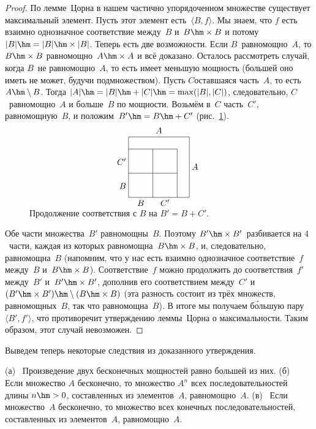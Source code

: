 \begin{proof}
По лемме~Цорна в нашем частично упорядоченном множестве
существует максимальный элемент. Пусть этот элемент
есть~$\langle B,f\rangle$. Мы знаем, что $f$ есть взаимно однозначное
соответствие между~$B$ и~$B\hm\times B$ и потому~$|B|\hm=|B|\hm\times|B|$.
Теперь есть две возможности. Если $B$~равномощно~$A$,
то $B\hm\times B$ равномощно~$A\hm\times A$ и всё
доказано. Осталось рассмотреть случай, когда $B$~не равномощно~$A$,
то есть имеет меньшую мощность (большей оно иметь не может,
будучи подмножеством). Пусть
$C$\т оставшаяся часть~$A$, то
есть~$A\hm\setminus B$. Тогда $|A|\hm=|B|\hm+|C|\hm=\max(|B|,|C|)$,
следовательно, $C$~равномощно~$A$ и больше~$B$ по мощности.
Возьмём в~$C$ часть~$C'$, равномощную~$B$, и положим~$B'\hm=B\hm+C'$
(рис.~\ref{card-2}).
\begin{figure}[ht]
        $$
\unitlength=0.5mm
\begin{picture}(50,55)
\put(0,0){\line(1,0){50}}
\put(0,50){\line(1,0){50}}
\put(0,0){\line(0,1){50}}
\put(50,0){\line(0,1){50}}
\put(20,0){\line(0,1){40}}
\put(40,0){\line(0,1){40}}
\put(0,20){\line(1,0){40}}
\put(0,40){\line(1,0){40}}
\put(10,-7){\hbox to 0pt{\hss $B$\hss}}
\put(30,-7){\hbox to 0pt{\hss $C'$\hss}}
\put(25,53){\hbox to 0pt{\hss $A$\hss}}
\put(-2,7){\hbox to 0pt{\hss $B$}}
\put(-2,27){\hbox to 0pt{\hss $C'$}}
\put(52,23){\hbox to 0pt{$A$\hss}}
\end{picture}
        $$
\caption{Продолжение соответствия с $B$ на $B'=B+C'$.}
\label{card-2}
\end{figure}
Обе части множества~$B'$ равномощны~$B$. Поэтому $B'\hm\times B'$~разбивается
на $4$~части, каждая из которых равномощна~$B\hm\times B$, и, следовательно,
равномощна~$B$ (напомним, что у нас есть
взаимно однозначное соответствие~$f$ между~$B$ и~$B\hm\times B$).
Соответствие~$f$ можно продолжить до соответствия~$f'$ между~$B'$
и~$B'\hm\times B'$, дополнив его соответствием между~$C'$
и $(B'\hm\times B')\hm\setminus(B\hm\times B)$ (эта разность состоит из трёх
множеств, равномощных~$B$, так что равномощна~$B$).
В итоге мы получаем б\'ольшую пару~$\langle B',f'\rangle$,
что противоречит утверждению леммы~Цорна о максимальности.
Таким образом, этот случай невозможен.
\end{proof}

Выведем теперь некоторые следствия из доказанного утверждения.

\begin{theorem}
        \label{sequences-cardinality}%
(\textsf{а})~%
Произведение двух
бесконечных мощностей равно большей из них.
(\textsf{б})~%
Если множество $A$ бесконечно, то множество $A^n$ всех
последовательностей длины $n\hm>0$, составленных из элементов~$A$,
равномощно~$A$.
(\textsf{в})~%
Если множество~$A$ бесконечно, то множество всех конечных
последовательностей, составленных из элементов~$A$, равномощно~$A$.
\end{theorem}

